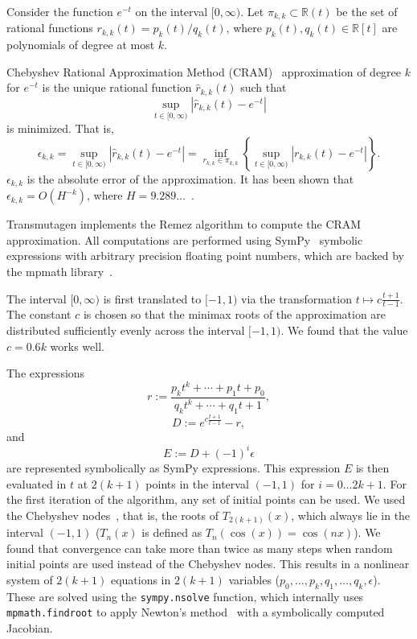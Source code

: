 Consider the function $e^{-t}$ on the interval $[0,\infty)$. Let
$\pi_{k,k}\subset \mathbb{R}(t)$ be the set of rational functions $r_{k,k}(t)
= p_k(t)/q_k(t)$, where $p_k(t), q_k(t)\in \mathbb{R}[t]$ are polynomials of
degree at most $k$.

Chebyshev Rational Approximation Method (CRAM)~\cite{ationneeded} approximation of degree $k$
for $e^{-t}$ is the unique rational function $\hat{r}_{k,k}(t)$ such that
\begin{equation}
  \sup_{t\in[0, \infty)}|\hat{r}_{k, k}(t) - e^{-t}|
\end{equation}
is minimized. That is,
\begin{equation}
  \epsilon_{k,k} = \sup_{t\in[0, \infty)}|\hat{r}_{k, k}(t) - e^{-t}| = \inf_{r_{k,k}\in\pi_{k,k}}\left\{\sup_{t\in[0, \infty)}|r_{k, k}(t) - e^{-t}|\right\}.
\end{equation}
$\epsilon_{k,k}$ is the absolute error of the approximation. It has been shown
that $\epsilon_{k,k} = O(H^{-k})$, where $H=9.289\ldots$~\cite{ationneeded}.

Transmutagen implements the Remez algorithm to compute the CRAM approximation.
All computations are performed using SymPy~\cite{10.7717/peerj-cs.103}
symbolic expressions with arbitrary precision floating point numbers, which
are backed by the mpmath library~\cite{ationneeded}.

The interval $[0, \infty)$ is first translated to $[-1, 1)$ via the
transformation $t\mapsto c\frac{t+1}{t-1}$. 
 The constant $c$
is chosen so that the minimax roots of the approximation are distributed
sufficiently evenly across the interval $[-1, 1)$. We found that the value
$c=0.6k$ works well.

The expressions
\begin{equation}
  r := \frac{p_kt^k + \cdots + p_1t + p_0}{q_kt^k + \cdots +
    q_1t + 1},
\end{equation}
\begin{equation}
  D := e^{c\frac{t+1}{t-1}} - r,
\end{equation}
and
\begin{equation}
  E := D + (-1)^i\epsilon
\end{equation}
are represented symbolically as SymPy expressions. This expression $E$ is
then evaluated in $t$ at $2(k + 1)$ points in the interval $(-1, 1)$ for
$i=0\ldots 2k+1$. For the first iteration of the algorithm, any set of initial
points can be used. We used the Chebyshev nodes~\cite{ationneeded}, that is,
the roots of $T_{2(k +1)}(x)$, which always lie in the interval $(-1, 1)$
($T_n(x)$ is defined as $T_n(\cos(x)) = \cos(nx)$). We found that convergence
can take more than twice as many steps when random initial points are used
instead of the Chebyshev nodes.  This results in a
nonlinear system of $2(k+1)$ equations in $2(k+1)$ variables
($p_0,\ldots,p_k,q_1,\ldots,q_k,\epsilon$). These are solved using the
\texttt{sympy.nsolve} function, which internally uses \texttt{mpmath.findroot}
to apply Newton's method~\cite{ationneeded} with a symbolically computed
Jacobian.

